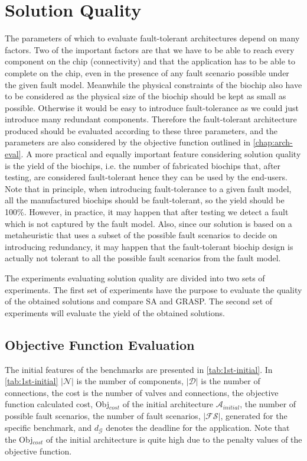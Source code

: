\section{Solution Quality}
The parameters of which to evaluate fault-tolerant architectures depend on many factors. Two of the important factors are that we have to be able to reach every component on the chip (connectivity) and that the application has to be able to complete on the chip, even in the presence of any fault scenario possible under the given fault model. Meanwhile the physical constraints of the biochip also have to be considered as the physical size of the biochip should be kept as small as possible. Otherwise it would be easy to introduce fault-tolerance as we could just introduce many redundant components. Therefore the fault-tolerant architecture produced should be evaluated according to these three parameters, and the parameters are also considered by the objective function outlined in \autoref{chap:arch-eval}. A more practical and equally important feature considering solution quality is the yield of the biochips, i.e. the number of fabricated biochips that, after testing, are considered fault-tolerant hence they can be used by the end-users. Note that in principle, when introducing fault-tolerance to a given fault model, all the manufactured biochips should be fault-tolerant, so the yield should be 100\%. However, in practice, it may happen that after testing we detect a fault which is not captured by the fault model. Also, since our solution is based on a metaheuristic that uses a subset of the possible fault scenarios to decide on introducing redundancy, it may happen that the fault-tolerant biochip design is actually not tolerant to all the possible fault scenarios from the fault model.

The experiments evaluating solution quality are divided into two sets of experiments. The first set of experiments have the purpose to evaluate the quality of the obtained solutions and compare SA and GRASP. The second set of experiments will evaluate the yield of the obtained solutions.

\subsection{Objective Function Evaluation}
The initial features of the benchmarks are presented in \autoref{tab:1st-initial}. In \autoref{tab:1st-initial} $|\mathcal{N}|$ is the number of components, $|\mathcal{D}|$ is the number of connections, the cost is the number of valves and connections, the objective function calculated cost, Obj$_{cost}$ of the initial architecture $\mathcal{A}_{initial}$, the number of possible fault scenarios, the number of fault scenarios, $|\mathcal{FS}|$, generated for the specific benchmark, and $d_{\mathcal{G}}$ denotes the deadline for the application. Note that the Obj$_{cost}$ of the initial architecture is quite high due to the penalty values of the objective function.

